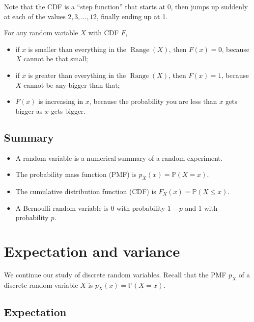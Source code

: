 \documentclass[
  letterpaper,
]{report}
\providecommand{\tightlist}{%
  \setlength{\itemsep}{0pt}\setlength{\parskip}{0pt}}\usepackage{longtable,booktabs,array}
\theoremstyle{definition}
\theoremstyle{definition}
\theoremstyle{remark}
\begin{document}
Note that the CDF is a ``step function'' that starts at 0, then jumps up
suddenly at each of the values \(2, 3, \dots, 12\), finally ending up at
1.

For any random variable \(X\) with CDF \(F\),

\begin{itemize}
\tightlist
\item
  if \(x\) is smaller than everything in the
  \(\operatorname{Range}(X)\), then \(F(x) = 0\), because \(X\) cannot
  be that small;
\item
  if \(x\) is greater than everything in the
  \(\operatorname{Range}(X)\), then \(F(x) = 1\), because \(X\) cannot
  be any bigger than that;
\item
  \(F(x)\) is increasing in \(x\), because the probability you are less
  than \(x\) gets bigger as \(x\) gets bigger.
\end{itemize}

\hypertarget{summary-L09}{%
\section*{Summary}\label{summary-L09}}


\begin{itemize}
\tightlist
\item
  A random variable is a numerical summary of a random experiment.
\item
  The probability mass function (PMF) is \(p_X(x) = \mathbb P(X = x)\).
\item
  The cumulative distribution function (CDF) is
  \(F_X(x) = \mathbb P(X \leq x)\).
\item
  A Bernoulli random variable is 0 with probability \(1-p\) and 1 with
  probability \(p\).
\end{itemize}

\hypertarget{L10-expectation}{%
\chapter{Expectation and variance}\label{L10-expectation}}

We continue our study of discrete random variables. Recall that the PMF
\(p_X\) of a discrete random variable \(X\) is
\(p_X(x) = \mathbb P(X = x)\).

\hypertarget{expectation}{%
\section{Expectation}\label{expectation}}
\end{document}
